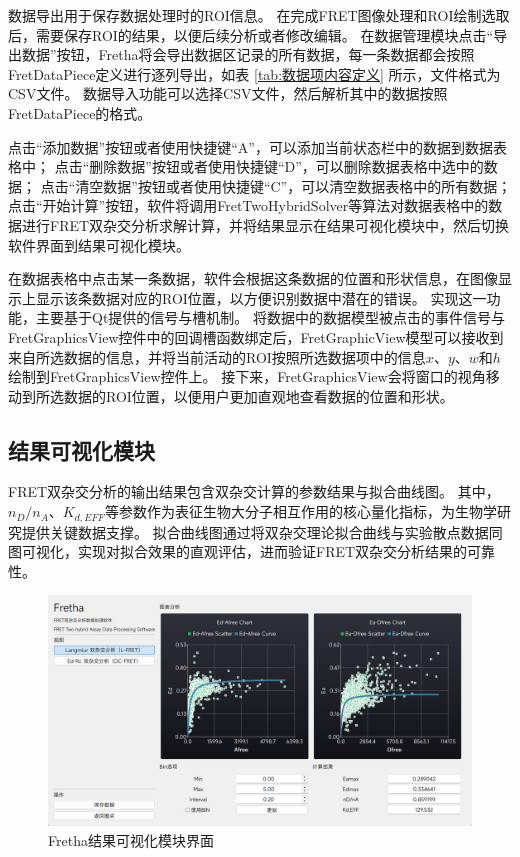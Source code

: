 数据导出用于保存数据处理时的ROI信息。
在完成FRET图像处理和ROI绘制选取后，需要保存ROI的结果，以便后续分析或者修改编辑。
在数据管理模块点击“导出数据”按钮，Fretha将会导出数据区记录的所有数据，每一条数据都会按照FretDataPiece定义进行逐列导出，如表 \ref{tab:数据项内容定义} 所示，文件格式为CSV文件。
数据导入功能可以选择CSV文件，然后解析其中的数据按照FretDataPiece的格式。

点击“添加数据”按钮或者使用快捷键“A”，可以添加当前状态栏中的数据到数据表格中；
点击“删除数据”按钮或者使用快捷键“D”，可以删除数据表格中选中的数据；
点击“清空数据”按钮或者使用快捷键“C”，可以清空数据表格中的所有数据；
点击“开始计算”按钮，软件将调用FretTwoHybridSolver等算法对数据表格中的数据进行FRET双杂交分析求解计算，并将结果显示在结果可视化模块中，然后切换软件界面到结果可视化模块。

在数据表格中点击某一条数据，软件会根据这条数据的位置和形状信息，在图像显示上显示该条数据对应的ROI位置，以方便识别数据中潜在的错误。
实现这一功能，主要基于Qt提供的信号与槽机制。
将数据中的数据模型被点击的事件信号与FretGraphicsView控件中的回调槽函数绑定后，FretGraphicView模型可以接收到来自所选数据的信息，并将当前活动的ROI按照所选数据项中的信息$x$、$y$、$w$和$h$绘制到FretGraphicsView控件上。
接下来，FretGraphicsView会将窗口的视角移动到所选数据的ROI位置，以便用户更加直观地查看数据的位置和形状。

\subsection{结果可视化模块}
\label{sec:结果可视化模块}
\ifshowtext
FRET双杂交分析的输出结果包含双杂交计算的参数结果与拟合曲线图。
其中，$n_D/n_A$、$K_{d,EFF}$等参数作为表征生物大分子相互作用的核心量化指标，为生物学研究提供关键数据支撑。
拟合曲线图通过将双杂交理论拟合曲线与实验散点数据同图可视化，实现对拟合效果的直观评估，进而验证FRET双杂交分析结果的可靠性。
\begin{figure}[h]
  \centering
  \includegraphics[width=0.9\linewidth]{../figures/2/2_结果可视化.png}
  \caption{Fretha结果可视化模块界面}
  \label{fig:fretha_result_ui}
\end{figure}

